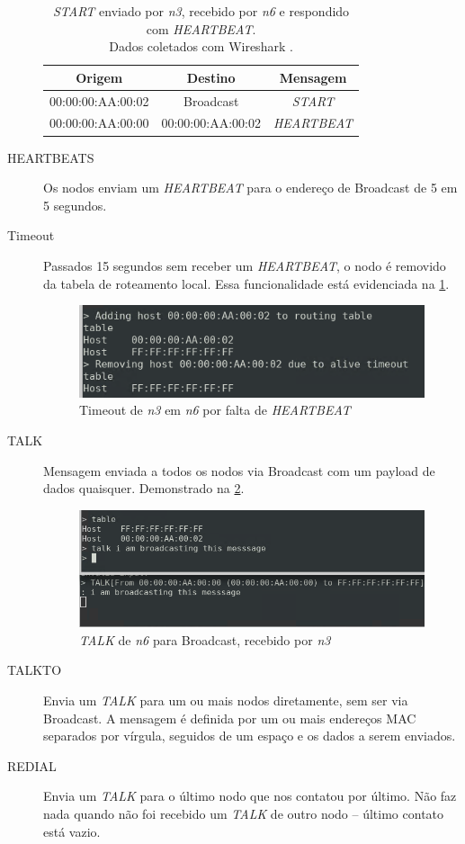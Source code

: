 \begin{description}
\begin{table}[H]
\begin{tabular}{ccc}
            \textbf{Origem} & \textbf{Destino} & \textbf{Mensagem}\\\hline
            00:00:00:AA:00:02 & Broadcast & \textit{START}\\
            00:00:00:AA:00:00 & 00:00:00:AA:00:02 & \textit{HEARTBEAT}
        \end{tabular}
        \caption{\textit{START} enviado por \textit{n3}, recebido por \textit{n6} e respondido com \textit{HEARTBEAT}.\\
        Dados coletados com Wireshark \cite{wireshark}.}
        \label{tab:heartbeat_start_print}
    \end{table}
    \item[HEARTBEATS] Os nodos enviam um \textit{HEARTBEAT} para o endereço de Broadcast de 5 em 5 segundos.
    \item[Timeout] Passados 15 segundos sem receber um \textit{HEARTBEAT}, o nodo é removido da tabela de roteamento local.
    Essa funcionalidade está evidenciada na \figurename{ \ref{fig:heartbeat_timeout_print}}.
    \begin{figure}[H]
        \centering
        \includegraphics[width=30em]{TIMEOUT.png}
        \caption{Timeout de \textit{n3} em \textit{n6} por falta de \textit{HEARTBEAT}}
        \label{fig:heartbeat_timeout_print}
    \end{figure}
    \item[TALK] Mensagem enviada a todos os nodos via Broadcast com um payload de dados quaisquer.
    Demonstrado na \figurename{ \ref{fig:talk_print}}.
    \begin{figure}[H]
        \centering
        \includegraphics[width=30em]{TALK.png}
        \caption{\textit{TALK} de \textit{n6} para Broadcast, recebido por \textit{n3}}
        \label{fig:talk_print}
    \end{figure}
    \item[TALKTO] Envia um \textit{TALK} para um ou mais nodos diretamente, sem ser via Broadcast.
    A mensagem é definida por um ou mais endereços MAC separados por vírgula, seguidos de um espaço e os dados a serem enviados.
    \item[REDIAL] Envia um \textit{TALK} para o último nodo que nos contatou por último.
    Não faz nada quando não foi recebido um \textit{TALK} de outro nodo -- último contato está vazio.
\end{description}

